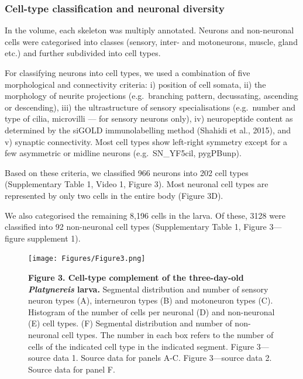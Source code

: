 \documentclass[
  11pt,
]{article}
\begin{document}
\subsubsection{Cell-type classification and neuronal
diversity}\label{cell-type-classification-and-neuronal-diversity}

In the volume, each skeleton was multiply annotated. Neurons and
non-neuronal cells were categorised into classes (sensory, inter- and
motoneurons, muscle, gland etc.) and further subdivided into cell types.

For classifying neurons into cell types, we used a combination of five
morphological and connectivity criteria: i) position of cell somata, ii)
the morphology of neurite projections (e.g.~branching pattern,
decussating, ascending or descending), iii) the ultrastructure of
sensory specialisations (e.g.~number and type of cilia, microvilli ---
for sensory neurons only), iv) neuropeptide content as determined by the
siGOLD immunolabelling method (Shahidi et al., 2015), and v) synaptic
connectivity. Most cell types show left-right symmetry except for a few
asymmetric or midline neurons (e.g.~SN\_YF5cil, pygPBunp).

Based on these criteria, we classified 966 neurons into 202 cell types
(Supplementary Table 1, Video 1, Figure 3). Most neuronal cell types are
represented by only two cells in the entire body (Figure 3D).

We also categorised the remaining 8,196 cells in the larva. Of these,
3128 were classified into 92 non-neuronal cell types (Supplementary
Table 1, Figure 3---figure supplement 1).

\begin{figure}[H]

{\centering \texttt{[image: Figures/Figure3.png]}

}

\caption{\textbf{Figure 3. Cell-type complement of the three-day-old
\emph{Platynereis} larva.} Segmental distribution and number of sensory
neuron types (A), interneuron types (B) and motoneuron types (C).
Histogram of the number of cells per neuronal (D) and non-neuronal (E)
cell types. (F) Segmental distribution and number of non-neuronal cell
types. The number in each box refers to the number of cells of the
indicated cell type in the indicated segment. Figure 3---source data 1.
Source data for panels A-C. Figure 3---source data 2. Source data for
panel F.}

\end{figure}%
\end{document}
